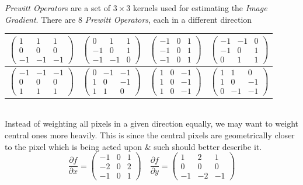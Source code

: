 \documentclass[11pt,a4paper]{article}
\begin{document}
\textit{Prewitt Operator}s are a set of $3\times3$ kernels used for estimating the \textit{Image Gradient}. There are 8 \textit{Prewitt Operators}, each in a different direction\\
\begin{tabular}{|c|c|c|c|}
\hline
$\begin{pmatrix}
1&1&1\\
0&0&0\\
-1&-1&-1
\end{pmatrix}$&
$\begin{pmatrix}
0&1&1\\
-1&0&1\\
-1&-1&0
\end{pmatrix}$&
$\begin{pmatrix}
-1&0&1\\
-1&0&1\\
-1&0&1
\end{pmatrix}$&
$\begin{pmatrix}
-1&-1&0\\
-1&0&1\\
0&1&1
\end{pmatrix}$\\
\hline
$\begin{pmatrix}
-1&-1&-1\\
0&0&0\\
1&1&1
\end{pmatrix}$&
$\begin{pmatrix}
0&-1&-1\\
1&0&-1\\
1&1&0
\end{pmatrix}$&
$\begin{pmatrix}
1&0&-1\\
1&0&-1\\
1&0&-1
\end{pmatrix}$&
$\begin{pmatrix}
1&1&0\\
1&0&-1\\
0&-1&-1
\end{pmatrix}$\\
\hline
\end{tabular}\\

Instead of weighting all pixels in a given direction equally, we may want to weight central ones more heavily. This is since the central pixels are geometrically closer to the pixel which is being acted upon \& such should better describe it.
$$\dfrac{\partial f}{\partial x}=\begin{pmatrix}
-1&0&1\\
-2&0&2\\
-1&0&1
\end{pmatrix}\quad\dfrac{\partial f}{\partial y}=\begin{pmatrix}
1&2&1\\
0&0&0\\
-1&-2&-1
\end{pmatrix}$$
\end{document}

